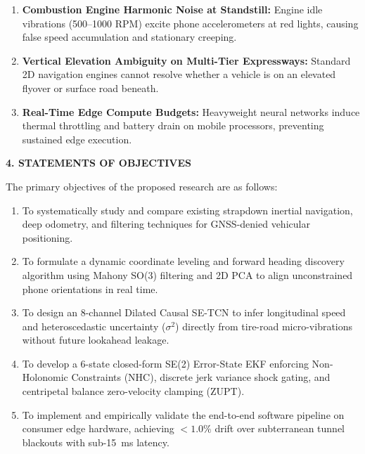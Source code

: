 \documentclass[11pt,a4paper]{article}
\begin{document}
\begin{enumerate}[label=(\alph*),leftmargin=0.7cm,itemsep=1.2pt,resume]
\item \textbf{Combustion Engine Harmonic Noise at Standstill:} Engine idle vibrations (500–1000 RPM) excite phone accelerometers at red lights, causing false speed accumulation and stationary creeping.
\item \textbf{Vertical Elevation Ambiguity on Multi-Tier Expressways:} Standard 2D navigation engines cannot resolve whether a vehicle is on an elevated flyover or surface road beneath.
\item \textbf{Real-Time Edge Compute Budgets:} Heavyweight neural networks induce thermal throttling and battery drain on mobile processors, preventing sustained edge execution.
\end{enumerate}

\vspace{0.15cm}
\begin{center}
{\large \textbf{4. STATEMENTS OF OBJECTIVES}}
\end{center}
The primary objectives of the proposed research are as follows:
\begin{enumerate}[leftmargin=0.7cm,itemsep=1.0pt]
\item To systematically study and compare existing strapdown inertial navigation, deep odometry, and filtering techniques for GNSS-denied vehicular positioning.
\item To formulate a dynamic coordinate leveling and forward heading discovery algorithm using Mahony SO(3) filtering and 2D PCA to align unconstrained phone orientations in real time.
\item To design an 8-channel Dilated Causal SE-TCN to infer longitudinal speed and heteroscedastic uncertainty ($\sigma^2$) directly from tire-road micro-vibrations without future lookahead leakage.
\item To develop a 6-state closed-form SE(2) Error-State EKF enforcing Non-Holonomic Constraints (NHC), discrete jerk variance shock gating, and centripetal balance zero-velocity clamping (ZUPT).
\item To implement and empirically validate the end-to-end software pipeline on consumer edge hardware, achieving $<1.0\%$ drift over subterranean tunnel blackouts with sub-15~ms latency.
\end{enumerate}
\end{document}
